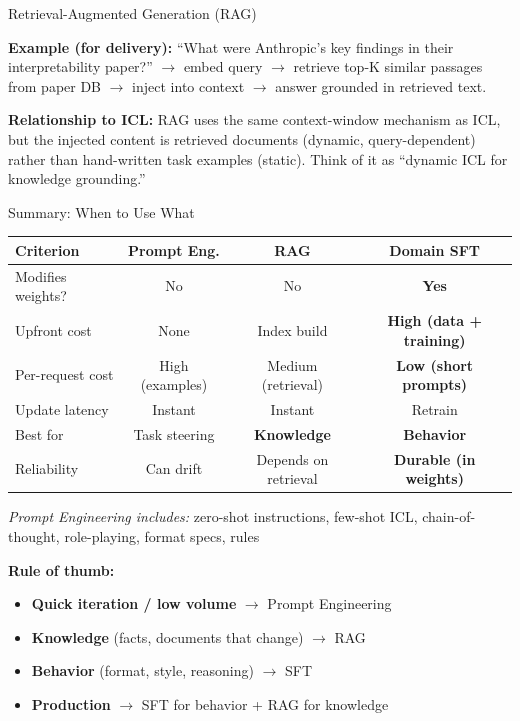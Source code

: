 \documentclass[aspectratio=169]{beamer}
\begin{document}
\begin{frame}{Retrieval-Augmented Generation (RAG)}
{    \textbf{Example (for delivery):} ``What were Anthropic's key findings in their interpretability paper?'' $\rightarrow$ embed query $\rightarrow$ retrieve top-K similar passages from paper DB $\rightarrow$ inject into context $\rightarrow$ answer grounded in retrieved text.

    \textbf{Relationship to ICL:} RAG uses the same context-window mechanism as ICL, but the injected content is retrieved documents (dynamic, query-dependent) rather than hand-written task examples (static). Think of it as ``dynamic ICL for knowledge grounding.''
  }
\end{frame}

\begin{frame}{Summary: When to Use What}
  \small
  \begin{center}
  \footnotesize
  \begin{tabular}{p{2.8cm}ccc}
    \toprule
    \textbf{Criterion} & \textbf{Prompt Eng.} & \textbf{RAG} & \textbf{Domain SFT} \\
    \midrule
    Modifies weights? & No & No & \textbf{Yes} \\
    Upfront cost & None & Index build & \textbf{High (data + training)} \\
    Per-request cost & High (examples) & Medium (retrieval) & \textbf{Low (short prompts)} \\
    Update latency & Instant & Instant & Retrain \\
    Best for & Task steering & \textbf{Knowledge} & \textbf{Behavior} \\
    Reliability & Can drift & Depends on retrieval & \textbf{Durable (in weights)} \\
    \bottomrule
  \end{tabular}
  \end{center}

  \vspace{6pt}
  {\scriptsize\color{NoteGray} \textit{Prompt Engineering includes:} zero-shot instructions, few-shot ICL, chain-of-thought, role-playing, format specs, rules}

  \vspace{6pt}
  \begin{noteframe}
    \textbf{Rule of thumb:}
    \begin{itemize}[itemsep=2pt,topsep=2pt]
      \item \textbf{Quick iteration / low volume} $\rightarrow$ Prompt Engineering
      \item \textbf{Knowledge} (facts, documents that change) $\rightarrow$ RAG
      \item \textbf{Behavior} (format, style, reasoning) $\rightarrow$ SFT
      \item \textbf{Production} $\rightarrow$ SFT for behavior + RAG for knowledge
    \end{itemize}
  \end{noteframe}


\end{frame}
\end{document}
